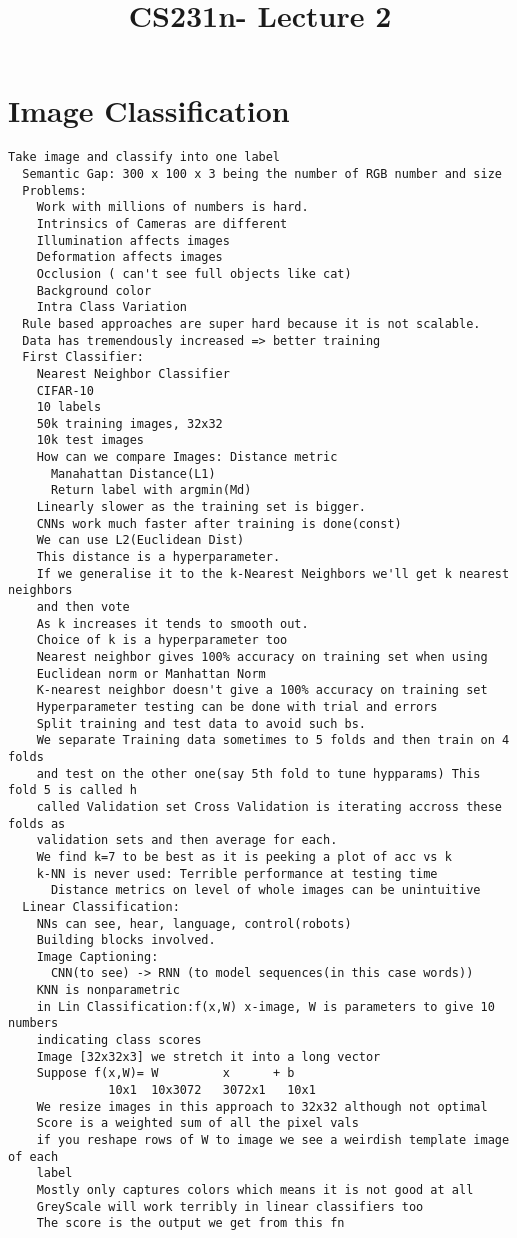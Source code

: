 \documentclass{article}
\begin{document}
\title{CS231n- Lecture 2}
\maketitle
\section{Image Classification}
\begin{lstlisting}
Take image and classify into one label
  Semantic Gap: 300 x 100 x 3 being the number of RGB number and size
  Problems:
    Work with millions of numbers is hard.
    Intrinsics of Cameras are different
    Illumination affects images
    Deformation affects images
    Occlusion ( can't see full objects like cat)
    Background color
    Intra Class Variation
  Rule based approaches are super hard because it is not scalable.
  Data has tremendously increased => better training
  First Classifier:
    Nearest Neighbor Classifier
    CIFAR-10
    10 labels
    50k training images, 32x32
    10k test images
    How can we compare Images: Distance metric
      Manahattan Distance(L1)
      Return label with argmin(Md)
    Linearly slower as the training set is bigger.
    CNNs work much faster after training is done(const)
    We can use L2(Euclidean Dist)
    This distance is a hyperparameter.
    If we generalise it to the k-Nearest Neighbors we'll get k nearest neighbors
    and then vote
    As k increases it tends to smooth out.
    Choice of k is a hyperparameter too
    Nearest neighbor gives 100% accuracy on training set when using
    Euclidean norm or Manhattan Norm
    K-nearest neighbor doesn't give a 100% accuracy on training set
    Hyperparameter testing can be done with trial and errors
    Split training and test data to avoid such bs.
    We separate Training data sometimes to 5 folds and then train on 4 folds
    and test on the other one(say 5th fold to tune hypparams) This fold 5 is called h
    called Validation set Cross Validation is iterating accross these folds as
    validation sets and then average for each.
    We find k=7 to be best as it is peeking a plot of acc vs k
    k-NN is never used: Terrible performance at testing time
      Distance metrics on level of whole images can be unintuitive
  Linear Classification:
    NNs can see, hear, language, control(robots)
    Building blocks involved.
    Image Captioning:
      CNN(to see) -> RNN (to model sequences(in this case words))
    KNN is nonparametric
    in Lin Classification:f(x,W) x-image, W is parameters to give 10 numbers
    indicating class scores
    Image [32x32x3] we stretch it into a long vector
    Suppose f(x,W)= W         x      + b
              10x1  10x3072   3072x1   10x1
    We resize images in this approach to 32x32 although not optimal
    Score is a weighted sum of all the pixel vals
    if you reshape rows of W to image we see a weirdish template image of each
    label
    Mostly only captures colors which means it is not good at all
    GreyScale will work terribly in linear classifiers too
    The score is the output we get from this fn
\end{lstlisting}
\end{document}
